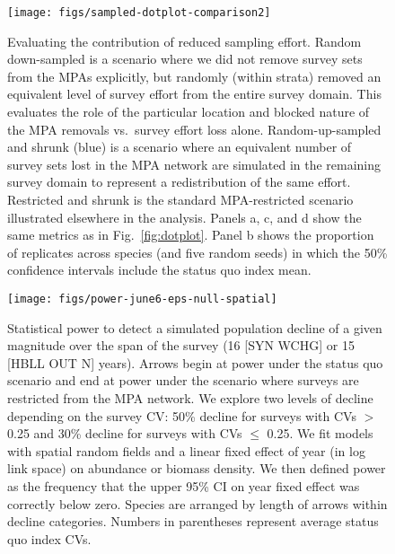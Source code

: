 \documentclass[12pt]{article}
\begin{document}
\clearpage

\begin{figure}[htb]
    \centering
    \texttt{[image: figs/sampled-dotplot-comparison2]}
    \caption{Evaluating the contribution of reduced sampling effort. Random down-sampled is a scenario where we did not remove survey sets from the MPAs explicitly, but randomly (within strata) removed an equivalent level of survey effort from the entire survey domain. This evaluates the role of the particular location and blocked nature of the MPA removals vs.\ survey effort loss alone. Random-up-sampled and shrunk (blue) is a scenario where an equivalent number of survey sets lost in the MPA network are simulated in the remaining survey domain to represent a redistribution of the same effort. Restricted and shrunk is the standard MPA-restricted scenario illustrated elsewhere in the analysis. Panels a, c, and d show the same metrics as in Fig.~\ref{fig:dotplot}. Panel b shows the proportion of replicates across species (and five random seeds) in which the 50\% confidence intervals include the status quo index mean.}
    \label{fig:sampling}
\end{figure}

\clearpage

\begin{figure}[htb]
    \centering
    \texttt{[image: figs/power-june6-eps-null-spatial]}
    \caption{Statistical power to detect a simulated population decline of a given magnitude over the span of the survey (16 [SYN WCHG] or 15 [HBLL OUT N] years). Arrows begin at power under the status quo scenario and end at power under the scenario where surveys are restricted from the MPA network. We explore two levels of decline depending on the survey CV: 50\% decline for surveys with CVs $>$ 0.25 and 30\% decline for surveys with CVs $\le$ 0.25. We fit models with spatial random fields and a linear fixed effect of year (in log link space) on abundance or biomass density. We then defined power as the frequency that the upper 95\% CI on year fixed effect was correctly below zero. Species are arranged by length of arrows within decline categories. Numbers in parentheses represent average status quo index CVs.}
    \label{fig:power}
\end{figure}

\end{document}
